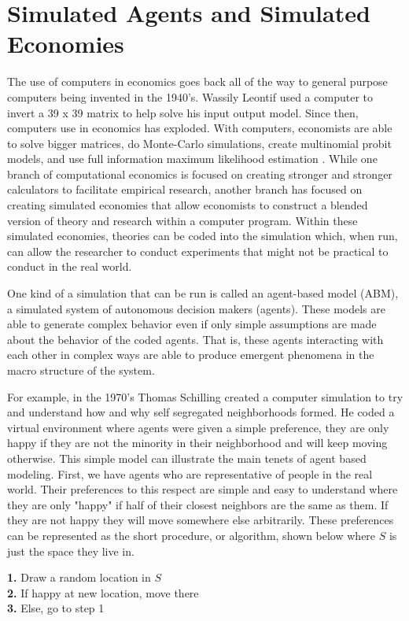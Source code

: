 \documentclass[12pt,twoside]{reedthesis}
\begin{document}
	
\section{Simulated Agents and Simulated Economies}
The use of computers in economics goes back all of the way to general purpose computers being invented in the 1940's. Wassily Leontif used a computer to invert a 39 x 39 matrix to help solve his input output model. Since then, computers use in economics has exploded. With computers, economists are able to solve bigger matrices, do Monte-Carlo simulations, create multinomial probit models, and use full information maximum likelihood estimation \citep{Backhouse2016}. While one branch of computational economics is focused on creating stronger and stronger calculators to facilitate empirical research, another branch has focused on creating simulated economies that allow economists to construct a blended version of theory and research within a computer program. Within these simulated economies, theories can be coded into the simulation which, when run, can allow the researcher to conduct experiments that might not be practical to conduct in the real world. 

One kind of a simulation that can be run is called an agent-based model (ABM), a simulated system of autonomous decision makers (agents). These models are able to generate complex behavior even if only simple assumptions are made about the behavior of the coded agents. That is, these agents interacting with each other in complex ways are able to produce emergent phenomena in the macro structure of the system.

For example, in the 1970's Thomas Schilling created a computer simulation to try and understand how and why self segregated neighborhoods formed. He coded a virtual environment where agents were given a simple preference, they are only happy if they are not the minority in their neighborhood and will keep moving otherwise. This simple model can illustrate the main tenets of agent based modeling. First, we have agents who are representative of people in the real world. Their preferences to this respect are simple and easy to understand where they are only "happy" if half of their closest neighbors are the same as them. If they are not happy they will move somewhere else arbitrarily. These preferences can be represented as the short procedure, or algorithm, shown below where $S$ is just the space they live in.

\begin{adjustwidth}{1cm}{}
	\textbf{1.} Draw a random location in $S$ \\
	\textbf{2.} If happy at new location, move there\\
	\textbf{3.} Else, go to step 1
\end{adjustwidth}
\end{document}
